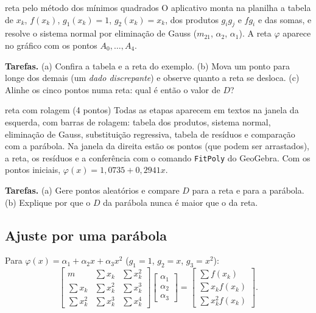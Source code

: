 \begin{atividade}{reta pelo método dos mínimos quadrados}{\arqMMQSimples}
O aplicativo monta na planilha a tabela de $x_k$, $f(x_k)$, $g_1(x_k)=1$, $g_2(x_k)=x_k$, dos produtos
$g_ig_j$ e $fg_i$ e das somas, e resolve o sistema normal por eliminação de Gauss ($m_{21}$, $\alpha_2$,
$\alpha_1$). A reta $\varphi$ aparece no gráfico com os pontos $A_0,\dots,A_4$.

\textbf{Tarefas.} (a) Confira a tabela e a reta do exemplo. (b) Mova um ponto para longe dos demais
(um \emph{dado discrepante}) e observe quanto a reta se desloca. (c) Alinhe os cinco pontos numa reta:
qual é então o valor de $D$?
\end{atividade}

\begin{atividade}{reta com rolagem (4 pontos)}{\arqRetaRol}
Todas as etapas aparecem em textos na janela da esquerda, com barras de rolagem: tabela dos produtos,
sistema normal, eliminação de Gauss, substituição regressiva, tabela de resíduos e comparação com a
parábola. Na janela da direita estão os pontos (que podem ser arrastados), a reta, os resíduos e a
conferência com o comando \texttt{FitPoly} do GeoGebra. Com os pontos iniciais,
$\varphi(x)=1{,}0735+0{,}2941x$.

\textbf{Tarefas.} (a) Gere pontos aleatórios e compare $D$ para a reta e para a parábola.
(b) Explique por que o $D$ da parábola nunca é maior que o da reta.
\end{atividade}

\subsection{Ajuste por uma parábola}

Para $\varphi(x)=\alpha_1+\alpha_2x+\alpha_3x^2$ ($g_1=1$, $g_2=x$, $g_3=x^2$):
\[
\begin{bmatrix} m & \sum x_k & \sum x_k^2\\ \sum x_k & \sum x_k^2 & \sum x_k^3\\ \sum x_k^2 & \sum x_k^3 & \sum x_k^4\end{bmatrix}
\begin{bmatrix}\alpha_1\\ \alpha_2\\ \alpha_3\end{bmatrix}=
\begin{bmatrix}\sum f(x_k)\\ \sum x_kf(x_k)\\ \sum x_k^2f(x_k)\end{bmatrix}.
\]

